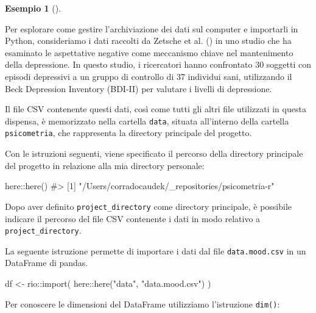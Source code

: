 \documentclass[
  letterpaper,
  DIV=11,
  numbers=noendperiod]{scrreprt}
\newenvironment{Shaded}{\begin{snugshade}}{\end{snugshade}}
\newcommand{\CommentTok}[1]{\textcolor[rgb]{0.37,0.37,0.37}{#1}}
\newcommand{\FunctionTok}[1]{\textcolor[rgb]{0.28,0.35,0.67}{#1}}
\newcommand{\NormalTok}[1]{\textcolor[rgb]{0.00,0.23,0.31}{#1}}
\newcommand{\OtherTok}[1]{\textcolor[rgb]{0.00,0.23,0.31}{#1}}
\newcommand{\SpecialCharTok}[1]{\textcolor[rgb]{0.37,0.37,0.37}{#1}}
\newcommand{\StringTok}[1]{\textcolor[rgb]{0.13,0.47,0.30}{#1}}
\theoremstyle{definition}
\newtheorem{example}{Esempio}[chapter]
\theoremstyle{remark}
\begin{document}
\begin{example}[]\protect\hypertarget{exm-}{}\label{exm-}

Per esplorare come gestire l'archiviazione dei dati sul computer e
importarli in Python, consideriamo i dati raccolti da Zetsche et al.
() in uno studio che ha esaminato
le aspettative negative come meccanismo chiave nel mantenimento della
depressione. In questo studio, i ricercatori hanno confrontato 30
soggetti con episodi depressivi a un gruppo di controllo di 37 individui
sani, utilizzando il Beck Depression Inventory (BDI-II) per valutare i
livelli di depressione.

Il file CSV contenente questi dati, così come tutti gli altri file
utilizzati in questa dispensa, è memorizzato nella cartella
\texttt{data}, situata all'interno della cartella \texttt{psicometria},
che rappresenta la directory principale del progetto.

Con le istruzioni seguenti, viene specificato il percorso della
directory principale del progetto in relazione alla mia directory
personale:

\begin{Shaded}
\begin{Highlighting}[]
\NormalTok{here}\SpecialCharTok{::}\FunctionTok{here}\NormalTok{()}
\CommentTok{\#\textgreater{} [1] "/Users/corradocaudek/\_repositories/psicometria{-}r"}
\end{Highlighting}
\end{Shaded}

Dopo aver definito \texttt{project\_directory} come directory
principale, è possibile indicare il percorso del file CSV contenente i
dati in modo relativo a \texttt{project\_directory}.

La seguente istruzione permette di importare i dati dal file
\texttt{data.mood.csv} in un DataFrame di pandas.

\begin{Shaded}
\begin{Highlighting}[]
\NormalTok{df }\OtherTok{\textless{}{-}}\NormalTok{ rio}\SpecialCharTok{::}\FunctionTok{import}\NormalTok{(}
\NormalTok{  here}\SpecialCharTok{::}\FunctionTok{here}\NormalTok{(}\StringTok{"data"}\NormalTok{, }\StringTok{"data.mood.csv"}\NormalTok{)}
\NormalTok{)}
\end{Highlighting}
\end{Shaded}

Per conoscere le dimensioni del DataFrame utilizziamo l'istruzione
\texttt{dim()}:


\end{example}
\end{document}
